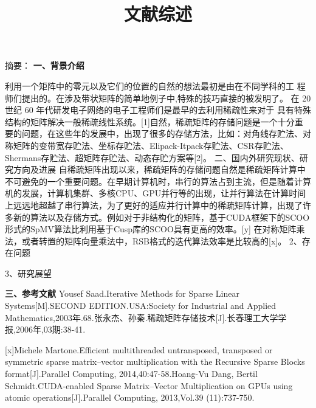 \documentclass{article}
\begin{document}
  

\title{文献综述}
\date{}

\maketitle

摘要：
\newline
\textbf{一、背景介绍}
      \qquad

利用一个矩阵中的零元以及它们的位置的自然的想法最初是由在不同学科的工 程师们提出的。在涉及带状矩阵的简单地例子中,特殊的技巧直接的被发明了。 在 20 世纪 60 年代研发电子网络的电子工程师们是最早的去利用稀疏性来对于 具有特殊结构的矩阵解决一般稀疏线性系统。[1]自然，稀疏矩阵的存储问题是一个十分重要的问题，在这些年的发展中，出现了很多的存储方法，比如：对角线存贮法、对称矩阵的变带宽存贮法、坐标存贮法、Elipack-Itpack存贮法、CSR存贮法、Shermans存贮法、超矩阵存贮法、动态存贮方案等[2]。
\newline
二、国内外研究现状、研究方向及进展\newline
自稀疏矩阵出现以来，稀疏矩阵的存储问题自然是稀疏矩阵计算中不可避免的一个重要问题。在早期计算机时，串行的算法占到主流，但是随着计算机的发展，计算机集群、多核CPU、GPU并行等的出现，让并行算法在计算时间上远远地超越了串行算法，为了更好的适应并行计算中的稀疏矩阵计算，出现了许多新的算法以及存储方式。例如对于非结构化的矩阵，基于CUDA框架下的SCOO形式的SpMV算法比利用基于Cusp库的SCOO具有更高的效率。[y]
在对称矩阵乘法，或者转置的矩阵向量乘法中，RSB格式的迭代算法效率是比较高的[x]。
2、存在问题\newline

3、研究展望\newline


\textbf{三、参考文献}
      \qquad
\newline
 [1]Yousef Saad.Iterative Methods for Sparse Linear Systems[M].SECOND EDITION.USA:Society for Industrial and Applied Mathematics,2003年.68.\newline
 [2]张永杰、孙秦.稀疏矩阵存储技术[J].长春理工大学学报,2006年,03期:38-41.\newline
  
  [x]Michele Martone.Efficient multithreaded untransposed, transposed or symmetric sparse matrix–vector multiplication with the Recursive Sparse Blocks format[J].Parallel Computing, 2014,40:47-58.\newline
   [y]Hoang-Vu Dang,  Bertil Schmidt.CUDA-enabled Sparse Matrix–Vector Multiplication on GPUs
using atomic operations[J].Parallel Computing, 2013,Vol.39 (11):737-750.\newline
  
\end{document}
